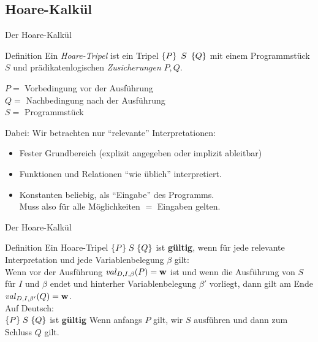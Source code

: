 \subsection{Hoare-Kalkül}
\begin{frame}{Der Hoare-Kalkül}
	\begin{block}{Definition}
		Ein \emph{Hoare-Tripel} ist ein Tripel $\left\{P\right\}\ S \ \left\{Q\right\}$ mit einem Programmstück $S$ und prädikatenlogischen \emph{Zusicherungen} $P,Q$.
	\end{block}
	\pause
	$P = $ Vorbedingung vor der Ausführung \\
	$Q = $ Nachbedingung nach der Ausführung\\
	$S = $ Programmstück
	
	\pause
	\bigskip
	Dabei: Wir betrachten nur \enquote{relevante} Interpretationen:
	\begin{itemize}[<+->]
		\item Fester Grundbereich (explizit angegeben oder implizit ableitbar)
		\item Funktionen und Relationen \enquote{wie üblich} interpretiert.
		\item Konstanten beliebig, als \enquote{Eingabe} des Programms.\\
		Muss also für alle Möglichkeiten $=$ Eingaben gelten.
	\end{itemize}
\end{frame}

\begin{frame}{Der Hoare-Kalkül}
	\begin{block}{Definition}
		Ein Hoare-Tripel $\{P\}\;S\; \{Q\}$ ist \textbf{gültig}, wenn für jede relevante Interpretation und jede Variablenbelegung $\beta$ gilt:\\
		Wenn vor der Ausführung $\hbox{\textit{val}}_{D,I,\beta}(P)=\hbox{\textbf{w}}$ ist und wenn die Ausführung von $S$ für $I$ und $\beta$ endet und hinterher Variablenbelegung $\beta'$ vorliegt, dann gilt am Ende $\hbox{\textit{val}}_{D,I,\beta'}(Q)=\hbox{\textbf{w}}$. \\
		\medskip
		Auf Deutsch: \\
		$\{P\}\;S\; \{Q\}$ ist \textbf{gültig} \Gdw Wenn anfangs $P$ gilt, wir $S$ ausführen und dann zum Schluss $Q$ gilt.
	\end{block}
\end{frame}

